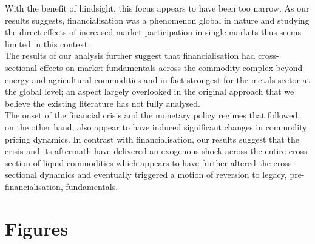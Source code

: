 \documentclass[
  authoryear,
  preprint,
  3p]{elsarticle}
\begin{document}
\medskip

With the benefit of hindsight, this focus appears to have been too
narrow. As our results suggests, financialisation was a phenomenon
global in nature and studying the direct effects of increased market
participation in single markets thus seems limited in this context.\\
The results of our analysis further suggest that financialisation had
cross-sectional effects on market fundamentals across the commodity
complex beyond energy and agricultural commodities and in fact strongest
for the metals sector at the global level; an aspect largely overlooked
in the original approach that we believe the existing literature has not
fully analysed.\\
The onset of the financial crisis and the monetary policy regimes that
followed, on the other hand, also appear to have induced significant
changes in commodity pricing dynamics. In contrast with
financialisation, our results suggest that the crisis and its aftermath
have delivered an exogenous shock across the entire cross-section of
liquid commodities which appears to have further altered the
cross-sectional dynamics and eventually triggered a motion of reversion
to legacy, pre-financialisation, fundamentals.

\newpage

\section*{Figures}\label{figures}
\end{document}
